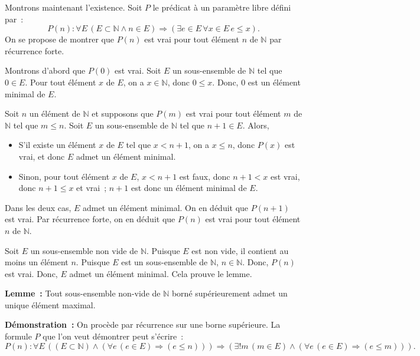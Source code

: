     Montrons maintenant l'existence. 
    Soit $P$ le prédicat à un paramètre libre défini par : 
    \begin{equation}
        P(n): \forall E \, (E \subset \mathbb{N} \wedge n \in E) \Rightarrow (\exists e \in E \, \forall x \in E \, e \leq x).
    \end{equation}
    On se propose de montrer que $P(n)$ est vrai pour tout élément $n$ de $\mathbb{N}$ par récurrence forte. 

    Montrons d'abord que $P(0)$ est vrai. 
    Soit $E$ un sous-ensemble de $\mathbb{N}$ tel que $0 \in E$. 
    Pour tout élément $x$ de $E$, on a $x \in \mathbb{N}$, donc $0 \leq x$. 
    Donc, $0$ est un élément minimal de $E$.

    Soit $n$ un élément de $\mathbb{N}$ et supposons que $P(m)$ est vrai pour tout élément $m$ de $\mathbb{N}$ tel que $m \leq n$. 
    Soit $E$ un sous-ensemble de $\mathbb{N}$ tel que $n+1 \in E$. 
    Alors, 
    \begin{itemize}[nosep]
        \item S'il existe un élément $x$ de $E$ tel que $x < n+1$, on a $x \leq n$, donc $P(x)$ est vrai, et donc $E$ admet un élément minimal.
        \item Sinon, pour tout élément $x$ de $E$, $x < n+1$ est faux, donc $n+1 < x$ est vrai, donc $n+1 \leq x$ et vrai ; $n+1$ est donc un élément minimal de $E$.
    \end{itemize}
    Dans les deux cas, $E$ admet un élément minimal. 
    On en déduit que $P(n+1)$ est vrai. 
    Par récurrence forte, on en déduit que $P(n)$ est vrai pour tout élément $n$ de $\mathbb{N}$. 
    
    Soit $E$ un sous-ensemble non vide de $\mathbb{N}$. 
    Puisque $E$ est non vide, il contient au moins un élément $n$. 
    Puisque $E$ est un sous-ensemble de $\mathbb{N}$, $n \in \mathbb{N}$. 
    Donc, $P(n)$ est vrai. 
    Donc, $E$ admet un élément minimal.
    Cela prouve le lemme. 

   \done 

\bigskip

\noindent\textbf{Lemme :} Tout sous-ensemble non-vide de $\mathbb{N}$ borné supérieurement admet un unique élément maximal.

\medskip

\noindent\textbf{Démonstration :} 
    On procède par récurrence sur une borne supérieure. 
    La formule $P$ que l'on veut démontrer peut s'écrire : 
    \begin{equation}
        P(n): 
        \forall E \, 
        ((E \subset \mathbb{N}) 
            \wedge (\forall e \, (e \in E) \Rightarrow (e \leq n)))
        \Rightarrow
        (\exists ! m \, (m \in E) \wedge 
            (\forall e \, (e \in E) \Rightarrow (e \leq m))).
    \end{equation}

